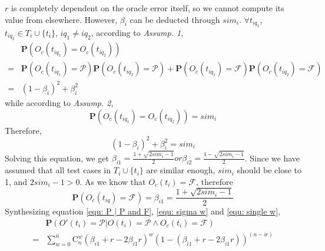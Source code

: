 $r$ is completely dependent on the oracle error itself, so we cannot compute its value from elsewhere. However, $\beta_i$ can be deducted through ${sim}_i$.
$\forall t_{iq_1}$, $t_{iq_2} \in T_i \cup \{t_i\}$, $iq_1 \ne iq_2$, according to \textit{Assump. 1},
\begin{equation}
\begin{aligned}
& \mathbf{P}(O_c(t_{iq_1}) = O_c(t_{iq_2})) \\
= & \mathbf{P}(O_c(t_{iq_1}) = \mathcal{P}) \mathbf{P}(O_c(t_{iq_2}) = \mathcal{P}) + \mathbf{P}(O_c(t_{iq_1})=  \mathcal{F}) \mathbf{P}(O_c(t_{iq_2}) = \mathcal{F}) \\
= & (1-\beta_i)^2 + \beta_i^2
\end{aligned}
\end{equation}
while according to \textit{Assump. 2},
$$\mathbf{P}(O_c(t_{iq_1}) = O_c(t_{iq_2})) = {sim}_i$$
Therefore,
$$
(1-\beta_i)^2 + \beta_i^2 = {sim}_i
$$
Solving this equation, we get $\beta_{i1} = \frac{1 + \sqrt{2 {sim}_i - 1}}{2} or \beta_{i2} = \frac{1 - \sqrt{2 {sim}_i - 1}}{2}$.
Since we have assumed that all test cases in $T_i \cup \{t_i\}$ are similar enough, ${sim}_i$ should be close to 1, and $2 {sim}_i - 1 > 0$. As we know that $O_c(t_i) = \mathcal{F}$, therefore
\begin{equation}
\label{equ: beta}
\mathbf{P}(O_c(t_{iq}) = \mathcal{F}) = \beta_{i1} = \frac{1 + \sqrt{2 {sim}_i - 1}}{2}
\end{equation}
Synthesizing equation \ref{equ: P | P and F}, \ref{equ: sigma w} and \ref{equ: single w},
\begin{equation}
\label{equ: P | P and F synth}
\begin{aligned}
& \mathbf{P}(O'(t_i) = \mathcal{P} | O(t_i) = \mathcal{P} \wedge O_c(t_i) = \mathcal{F}) \\
= & \sum_{w = 0}^{\hat{n}}{\mathrm{C}_n^w{(\beta_{i1} + r - 2\beta_{i1} r)^w (1-(\beta_{i1} + r - 2\beta_{i1} r))^{(n-w)}}}
\end{aligned}
\end{equation}

